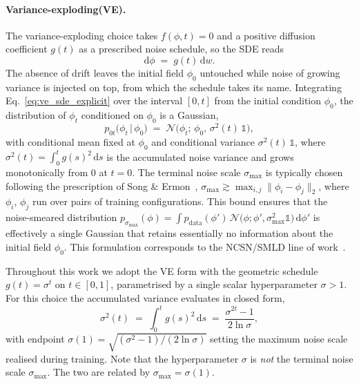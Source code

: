 \documentclass[reprint,twocolumn,superscriptaddress,preprintnumbers,amsmath,amssymb,aps,prd,floatfix]{revtex4-2}
\def\Eq#1{Eq.~\eqref{#1}}
\begin{document}
\paragraph{Variance-exploding(VE).}
The variance-exploding choice takes $f(\phi,t)=0$ and a positive diffusion coefficient $g(t)$ as a prescribed noise schedule, so the SDE reads
\begin{equation}
\mathrm{d}\phi \;=\; g(t)\,\mathrm{d}w.
\label{eq:ve_sde_explicit}
\end{equation}
The absence of drift leaves the initial field $\phi_0$ untouched while noise of growing variance is injected on top, from which the schedule takes its name. Integrating \Eq{eq:ve_sde_explicit} over the interval $[0,t]$ from the initial condition $\phi_0$, the distribution of $\phi_t$ conditioned on $\phi_0$ is a Gaussian,
\begin{equation}
p_{0t}\bigl(\phi_t\,\bigl|\,\phi_0\bigr) \;=\; \mathcal{N}\!\bigl(\phi_t;\,\phi_0,\,\sigma^{2}(t)\,\mathbb{1}\bigr),
\label{eq:ve_sde_kernel}
\end{equation}
with conditional mean fixed at $\phi_0$ and conditional variance $\sigma^2(t)\,\mathbb{1}$, where $\sigma^2(t)=\int_0^t g(s)^2\,\mathrm{d}s$ is the accumulated noise variance and grows monotonically from $0$ at $t=0$. The terminal noise scale $\sigma_{\max}$ is typically chosen following the prescription of Song \& Ermon~\cite{SongErmon2020}, $\sigma_{\max}\gtrsim\max_{i,j}\|\phi_{i}-\phi_{j}\|_{2}$, where $\phi_{i}$, $\phi_{j}$ run over pairs of training configurations. This bound ensures that the noise-smeared distribution $p_{\sigma_{\max}}(\phi)=\int p_{\text{data}}(\phi')\,\mathcal{N}\!\bigl(\phi;\phi',\sigma_{\max}^2\mathbb{1}\bigr)\,\mathrm{d}\phi'$ is effectively a single Gaussian that retains essentially no information about the initial field $\phi_0$. This formulation corresponds to the NCSN/SMLD line of work~\cite{SongErmon2019}.

Throughout this work we adopt the VE form with the geometric schedule $g(t)=\sigma^{t}$ on $t\in[0,1]$, parametrised by a single scalar hyperparameter $\sigma>1$. For this choice the accumulated variance evaluates in closed form,
\begin{equation}
\sigma^{2}(t) \;=\; \int_{0}^{t}\!g(s)^{2}\,\mathrm{d}s \;=\; \frac{\sigma^{2t}-1}{2\ln\sigma},
\label{eq:ve_sigma_schedule}
\end{equation}
with endpoint $\sigma(1)=\sqrt{(\sigma^{2}-1)/(2\ln\sigma)}$ setting the maximum noise scale realised during training. Note that the hyperparameter $\sigma$ is \emph{not} the terminal noise scale $\sigma_{\max}$. The two are related by $\sigma_{\max}=\sigma(1)$.
\end{document}
